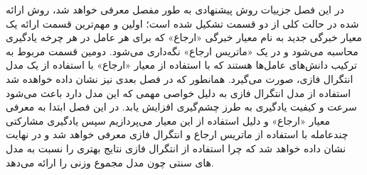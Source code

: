 در این فصل جزییات روش پیشنهادی به طور مفصل معرفی خواهد شد، روش ارائه شده در حالت کلی از دو قسمت تشکیل شده است؛ اولین و مهم‌ترین قسمت ارائه یک معیار خبرگی جدید به نام معیار خبرگی «ارجاع» که برای هر عامل در هر چرخه یادگیری محاسبه می‌شود و در یک «ماتریس ارجاع» نگه‌داری می‌شود. دومین قسمت مربوط به ترکیب دانش‌های عامل‌ها هستند که با استفاده از معیار «ارجاع» با استفاده از یک مدل انتگرال فازی، صورت می‌گیرد. همانطور که در فصل بعدی نیز نشان داده خواهده شد استفاده از مدل انتگرال فازی به دلیل خواصی مهمی که این مدل دارد باعث می‌شود سرعت و کیفیت یادگیری به طرز چشم‌گیری افزایش یابد. در این فصل ابتدا به معرفی معیار «ارجاع» و دلیل استفاده از این معیار می‌پردازیم سپس یادگیری مشارکتی چندعامله با استفاده از ماتریس ارجاع و انتگرال فازی معرفی خواهد شد و در نهایت نشان داده خواهد شد که چرا استفاده از انتگرال فازی نتایج بهتری را نسبت به مدل های سنتی چون مدل مجموع وزنی را ارائه می‌دهد.